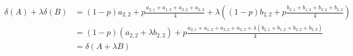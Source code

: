 $$
    \begin{aligned}
        \delta(A) + \lambda\delta(B) &= (1-p) a_{2,2} + p\frac{a_{2,1}+a_{1,2}+a_{3,2}+a_{2,3}}{4} + \lambda\left( (1-p) b_{2,2} + p\frac{b_{2,1}+b_{1,2}+b_{3,2}+b_{2,3}}{4} \right)\\
        &= (1-p) (a_{2,2} + \lambda b_{2,2}) + p\frac{a_{2,1}+a_{1,2}+a_{3,2}+a_{2,3} + \lambda (b_{2,1}+b_{1,2}+b_{3,2}+b_{2,3})}{4}\\
        &=\delta(A + \lambda B)
    \end{aligned}
$$

